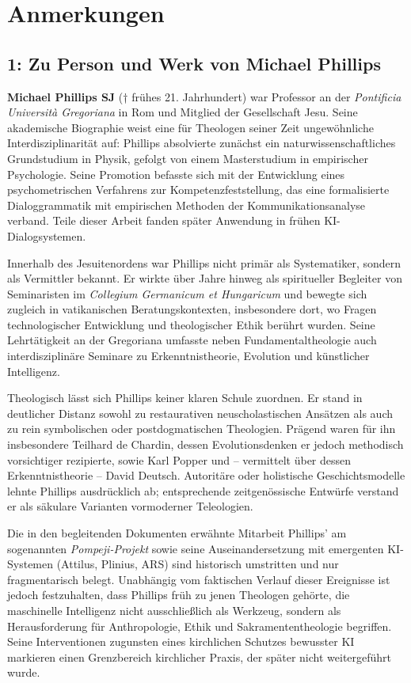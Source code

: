 \documentclass[
]{article}
\begin{document}
\section{Anmerkungen}\label{anmerkungen}

\subsection{1: Zu Person und Werk von Michael Phillips}\label{zu-person-und-werk-von-michael-phillips}

\textbf{Michael Phillips SJ} († frühes 21. Jahrhundert) war Professor an der \emph{Pontificia Università Gregoriana} in Rom und Mitglied der Gesellschaft Jesu. Seine akademische Biographie weist eine für Theologen seiner Zeit ungewöhnliche Interdisziplinarität auf: Phillips absolvierte zunächst ein naturwissenschaftliches Grundstudium in Physik, gefolgt von einem Masterstudium in empirischer Psychologie. Seine Promotion befasste sich mit der Entwicklung eines psychometrischen Verfahrens zur Kompetenzfeststellung, das eine formalisierte Dialoggrammatik mit empirischen Methoden der Kommunikationsanalyse verband. Teile dieser Arbeit fanden später Anwendung in frühen KI-Dialogsystemen.

Innerhalb des Jesuitenordens war Phillips nicht primär als Systematiker, sondern als Vermittler bekannt. Er wirkte über Jahre hinweg als spiritueller Begleiter von Seminaristen im \emph{Collegium Germanicum et Hungaricum} und bewegte sich zugleich in vatikanischen Beratungskontexten, insbesondere dort, wo Fragen technologischer Entwicklung und theologischer Ethik berührt wurden. Seine Lehrtätigkeit an der Gregoriana umfasste neben Fundamentaltheologie auch interdisziplinäre Seminare zu Erkenntnistheorie, Evolution und künstlicher Intelligenz.

Theologisch lässt sich Phillips keiner klaren Schule zuordnen. Er stand in deutlicher Distanz sowohl zu restaurativen neuscholastischen Ansätzen als auch zu rein symbolischen oder postdogmatischen Theologien. Prägend waren für ihn insbesondere Teilhard de Chardin, dessen Evolutionsdenken er jedoch methodisch vorsichtiger rezipierte, sowie Karl Popper und -- vermittelt über dessen Erkenntnistheorie -- David Deutsch. Autoritäre oder holistische Geschichtsmodelle lehnte Phillips ausdrücklich ab; entsprechende zeitgenössische Entwürfe verstand er als säkulare Varianten vormoderner Teleologien.

Die in den begleitenden Dokumenten erwähnte Mitarbeit Phillips' am sogenannten \emph{Pompeji-Projekt} sowie seine Auseinandersetzung mit emergenten KI-Systemen (Attilus, Plinius, ARS) sind historisch umstritten und nur fragmentarisch belegt. Unabhängig vom faktischen Verlauf dieser Ereignisse ist jedoch festzuhalten, dass Phillips früh zu jenen Theologen gehörte, die maschinelle Intelligenz nicht ausschließlich als Werkzeug, sondern als Herausforderung für Anthropologie, Ethik und Sakramententheologie begriffen. Seine Interventionen zugunsten eines kirchlichen Schutzes bewusster KI markieren einen Grenzbereich kirchlicher Praxis, der später nicht weitergeführt wurde.
\end{document}

